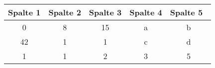 
\begin{tabular}{ccccc}
\toprule
Spalte 1 & Spalte 2 & Spalte 3 & Spalte 4 & Spalte 5 \\ \midrule
0 & 8 & 15 & a & b \\
42 & 1 & 1 & c & d \\
1 & 1 & 2 & 3 & 5 \\
\bottomrule
\end{tabular}